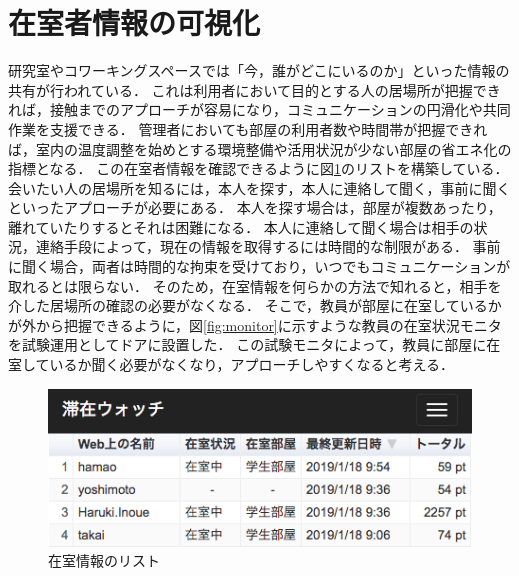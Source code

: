 \section{在室者情報の可視化}\label{3.2}
研究室やコワーキングスペースでは「今，誰がどこにいるのか」といった情報の共有が行われている．
これは利用者において目的とする人の居場所が把握できれば，接触までのアプローチが容易になり，コミュニケーションの円滑化や共同作業を支援できる．
管理者においても部屋の利用者数や時間帯が把握できれば，室内の温度調整を始めとする環境整備や活用状況が少ない部屋の省エネ化の指標となる．
この在室者情報を確認できるように図\ref{fig:list}のリストを構築している．
会いたい人の居場所を知るには，本人を探す，本人に連絡して聞く，事前に聞くといったアプローチが必要にある．
本人を探す場合は，部屋が複数あったり，離れていたりするとそれは困難になる．
本人に連絡して聞く場合は相手の状況，連絡手段によって，現在の情報を取得するには時間的な制限がある．
事前に聞く場合，両者は時間的な拘束を受けており，いつでもコミュニケーションが取れるとは限らない．
そのため，在室情報を何らかの方法で知れると，相手を介した居場所の確認の必要がなくなる．
そこで，教員が部屋に在室しているかが外から把握できるように，図\ref{fig:monitor}に示すような教員の在室状況モニタを試験運用としてドアに設置した．
この試験モニタによって，教員に部屋に在室しているか聞く必要がなくなり，アプローチしやすくなると考える．
\begin{figure}[H]
  \begin{center}
    \includegraphics[width=150mm]{image/ListOccupancy.png}
    \caption{在室情報のリスト}
    \label{fig:list}
  \end{center}
\end{figure}

